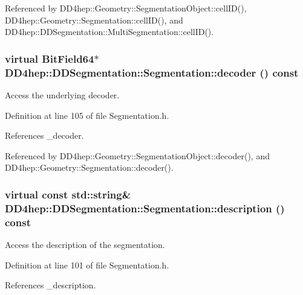 Referenced by DD4hep::Geometry::SegmentationObject::cellID(), DD4hep::Geometry::Segmentation::cellID(), and DD4hep::DDSegmentation::MultiSegmentation::cellID().\hypertarget{class_d_d4hep_1_1_d_d_segmentation_1_1_segmentation_a2e41ad4d215c115b00686e4ffd935851}{
\subsubsection[{decoder}]{\setlength{\rightskip}{0pt plus 5cm}virtual {\bf BitField64}$\ast$ DD4hep::DDSegmentation::Segmentation::decoder () const}}
\label{class_d_d4hep_1_1_d_d_segmentation_1_1_segmentation_a2e41ad4d215c115b00686e4ffd935851}


Access the underlying decoder. 

Definition at line 105 of file Segmentation.h.

References \_\-decoder.

Referenced by DD4hep::Geometry::SegmentationObject::decoder(), and DD4hep::Geometry::Segmentation::decoder().\hypertarget{class_d_d4hep_1_1_d_d_segmentation_1_1_segmentation_a27f02f639e514a43d5c90f22bbaa57df}{
\subsubsection[{description}]{\setlength{\rightskip}{0pt plus 5cm}virtual const std::string\& DD4hep::DDSegmentation::Segmentation::description () const}}
\label{class_d_d4hep_1_1_d_d_segmentation_1_1_segmentation_a27f02f639e514a43d5c90f22bbaa57df}


Access the description of the segmentation. 

Definition at line 101 of file Segmentation.h.

References \_\-description.

